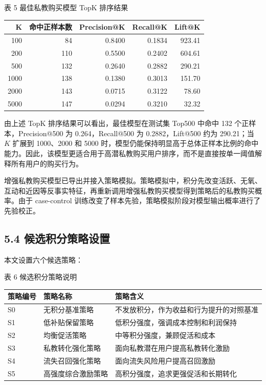 \documentclass[
  12pt,
]{ctexart}
\begin{document}
\begin{center}\small 表 5 最佳私教购买模型 TopK 排序结果\end{center}

\begin{longtable}[]{@{}rrrrr@{}}
\toprule
K & 命中正样本数 & Precision@K & Recall@K & Lift@K \\
\midrule
\endhead
100 & 84 & 0.8400 & 0.1834 & 923.41 \\
200 & 110 & 0.5500 & 0.2402 & 604.61 \\
500 & 132 & 0.2640 & 0.2882 & 290.21 \\
1000 & 138 & 0.1380 & 0.3013 & 151.70 \\
2000 & 143 & 0.0715 & 0.3122 & 78.60 \\
5000 & 147 & 0.0294 & 0.3210 & 32.32 \\
\bottomrule
\end{longtable}

由上述 TopK 排序结果可以看出，最佳模型在测试集 Top500 中命中 132 个正样本，Precision@500 为 0.264，Recall@500 为 0.2882，Lift@500 约为 290.21；当 \(K\) 扩展到 1000、2000 和 5000 时，模型仍能保持明显高于总体正样本比例的命中能力。因此，该模型更适合用于高潜私教购买用户排序，而不是直接按单一阈值解释所有用户的购买行为。

增强私教购买模型已导出并接入策略模拟。策略模拟中，积分先改变活跃、无氧、互动和近因等反事实特征，再重新调用增强私教购买模型得到策略后的私教购买概率。由于 case-control 训练改变了样本先验，策略模拟阶段对模型输出概率进行了先验校正。

\hypertarget{ux5019ux9009ux79efux5206ux7b56ux7565ux8bbeux7f6e}{%
\subsection{5.4 候选积分策略设置}\label{ux5019ux9009ux79efux5206ux7b56ux7565ux8bbeux7f6e}}

本文设置六个候选策略：

\begin{center}\small 表 6 候选积分策略说明\end{center}

\begin{longtable}[]{@{}lll@{}}
\toprule
策略编号 & 策略名称 & 策略含义 \\
\midrule
\endhead
S0 & 无积分基准策略 & 不发放积分，作为收益和行为提升的对照基准 \\
S1 & 低补贴保留策略 & 低积分强度，强调成本控制和利润保持 \\
S2 & 均衡促活策略 & 中等积分强度，兼顾促活和成本 \\
S3 & 私教转化强化策略 & 面向私教潜在用户提高私教转化激励 \\
S4 & 流失召回强化策略 & 面向流失风险用户提高召回激励 \\
S5 & 高强度综合激励策略 & 高积分强度，追求更强促活和长期转化 \\
\bottomrule
\end{longtable}
\end{document}
